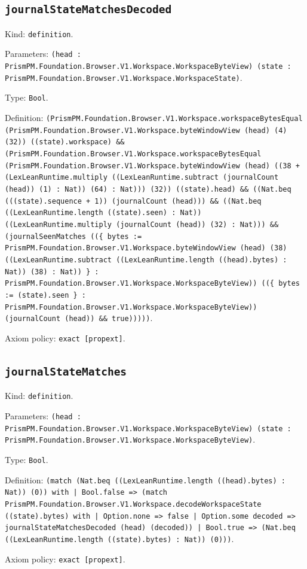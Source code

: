 \documentclass[11pt]{article}
\begin{document}
\subsection*{\texttt{journalStateMatchesDecoded}}
\noindent Kind: \texttt{definition}.\par
\noindent Parameters: \texttt{(head : PrismPM.Foundation.Browser.V1.Workspace.WorkspaceByteView) (state : PrismPM.Foundation.Browser.V1.Workspace.WorkspaceState)}.\par
\noindent Type: \texttt{Bool}.\par
\noindent Definition: \texttt{(PrismPM.Foundation.Browser.V1.Workspace.workspaceBytesEqual (PrismPM.Foundation.Browser.V1.Workspace.byteWindowView (head) (4) (32)) ((state).workspace) \&\& (PrismPM.Foundation.Browser.V1.Workspace.workspaceBytesEqual (PrismPM.Foundation.Browser.V1.Workspace.byteWindowView (head) ((38 + (LexLeanRuntime.multiply ((LexLeanRuntime.subtract (journalCount (head)) (1) : Nat)) (64) : Nat))) (32)) ((state).head) \&\& ((Nat.beq (((state).sequence + 1)) (journalCount (head))) \&\& ((Nat.beq ((LexLeanRuntime.length ((state).seen) : Nat)) ((LexLeanRuntime.multiply (journalCount (head)) (32) : Nat))) \&\& (journalSeenMatches ((\{ bytes := PrismPM.Foundation.Browser.V1.Workspace.byteWindowView (head) (38) ((LexLeanRuntime.subtract ((LexLeanRuntime.length ((head).bytes) : Nat)) (38) : Nat)) \} : PrismPM.Foundation.Browser.V1.Workspace.WorkspaceByteView)) ((\{ bytes := (state).seen \} : PrismPM.Foundation.Browser.V1.Workspace.WorkspaceByteView)) (journalCount (head)) \&\& true)))))}.\par
\noindent Axiom policy: \texttt{exact [propext]}.\par
\subsection*{\texttt{journalStateMatches}}
\noindent Kind: \texttt{definition}.\par
\noindent Parameters: \texttt{(head : PrismPM.Foundation.Browser.V1.Workspace.WorkspaceByteView) (state : PrismPM.Foundation.Browser.V1.Workspace.WorkspaceByteView)}.\par
\noindent Type: \texttt{Bool}.\par
\noindent Definition: \texttt{(match (Nat.beq ((LexLeanRuntime.length ((head).bytes) : Nat)) (0)) with | Bool.false => (match PrismPM.Foundation.Browser.V1.Workspace.decodeWorkspaceState ((state).bytes) with | Option.none => false | Option.some decoded => journalStateMatchesDecoded (head) (decoded)) | Bool.true => (Nat.beq ((LexLeanRuntime.length ((state).bytes) : Nat)) (0)))}.\par
\noindent Axiom policy: \texttt{exact [propext]}.\par
\end{document}

